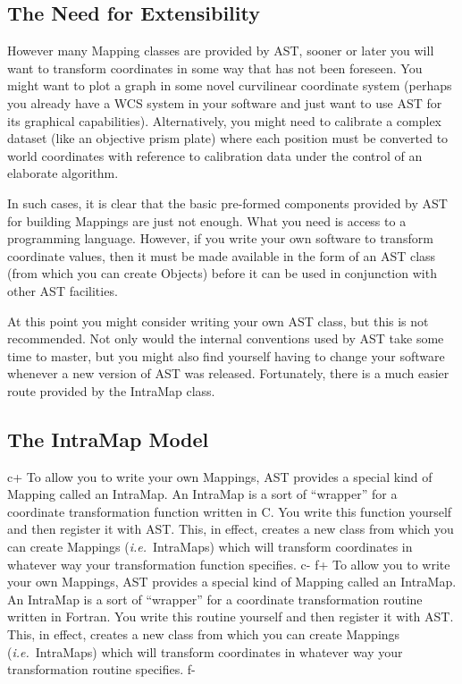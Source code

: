 \documentclass[twoside,11pt]{starlink}
\begin{document}
\subsection{The Need for Extensibility}

However many Mapping classes are provided by AST, sooner or later you
will want to transform coordinates in some way that has not been
foreseen. You might want to plot a graph in some novel curvilinear
coordinate system (perhaps you already have a WCS system in your
software and just want to use AST for its graphical capabilities).
Alternatively, you might need to calibrate a complex dataset (like an
objective prism plate) where each position must be converted to world
coordinates with reference to calibration data under the control of an
elaborate algorithm.

In such cases, it is clear that the basic pre-formed components
provided by AST for building Mappings are just not enough. What you
need is access to a programming language. However, if you write your
own software to transform coordinate values, then it must be made
available in the form of an AST class (from which you can create
Objects) before it can be used in conjunction with other AST
facilities.

At this point you might consider writing your own AST class, but this
is not recommended. Not only would the internal conventions used by
AST take some time to master, but you might also find yourself having
to change your software whenever a new version of AST was
released. Fortunately, there is a much easier route provided by the
IntraMap class.

\subsection{The IntraMap Model}

c+
To allow you to write your own Mappings, AST provides a special kind
of Mapping called an IntraMap. An IntraMap is a sort of ``wrapper''
for a coordinate transformation function written in C. You write this
function yourself and then register it with AST. This, in effect,
creates a new class from which you can create Mappings
(\emph{i.e.}\ IntraMaps) which will transform coordinates in whatever
way your transformation function specifies.
c-
f+
To allow you to write your own Mappings, AST provides a special kind
of Mapping called an IntraMap. An IntraMap is a sort of ``wrapper''
for a coordinate transformation routine written in Fortran. You write
this routine yourself and then register it with AST. This, in effect,
creates a new class from which you can create Mappings
(\emph{i.e.}\ IntraMaps) which will transform coordinates in whatever
way your transformation routine specifies.
f-
\end{document}

